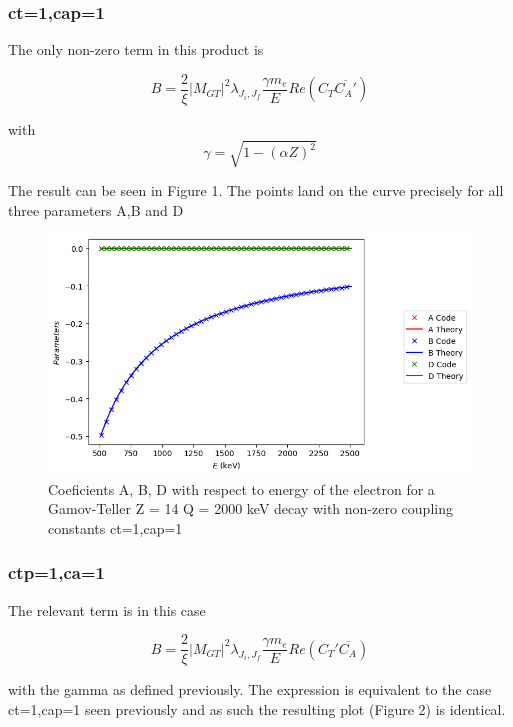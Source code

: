 \documentclass[twocolumn]{article}
\begin{document}
\subsubsection*{ct=1,cap=1}

The only non-zero term in this product is

$$B= \frac{2}{\xi}|M_{GT}|^2\lambda_{J_i,J_f}\frac{\gamma m_e}{E}Re(C_T\overline{C_A'})$$

with $$\gamma = \sqrt{1-(\alpha Z)^2}$$

The result can be seen in Figure 1. The points land on the curve precisely for all three parameters A,B and D

\begin{figure}
	\centering
	\includegraphics[width=\columnwidth]{plots/ctcap_real_gt_result.png}
	\caption{Coeficients A, B, D with respect to energy of the electron for a Gamov-Teller Z = 14 Q = 2000 keV decay with non-zero coupling constants ct=1,cap=1}
\end{figure}

\subsubsection*{ctp=1,ca=1}

The relevant term is in this case

$$B= \frac{2}{\xi}|M_{GT}|^2\lambda_{J_i,J_f}\frac{\gamma m_e}{E}Re(C_T'\overline{C_A})$$

with the gamma as defined previously. The expression is equivalent to the case ct=1,cap=1 seen previously and as such the resulting plot (Figure 2) is identical.
\end{document}
